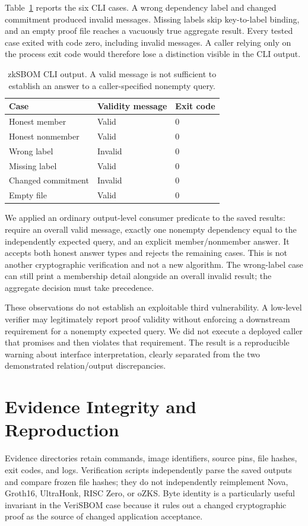 \documentclass[sigconf,nonacm]{acmart}
\begin{document}
Table~\ref{tab:zksbom} reports the six CLI cases. A wrong dependency label and changed commitment produced invalid messages. Missing labels skip key-to-label binding, and an empty proof file reaches a vacuously true aggregate result. Every tested case exited with code zero, including invalid messages. A caller relying only on the process exit code would therefore lose a distinction visible in the CLI output.

\begin{table}[t]
\caption{zkSBOM CLI output. A valid message is not sufficient to establish an answer to a caller-specified nonempty query.}
\label{tab:zksbom}
\centering\small
\begin{tabular}{@{}lll@{}}
\toprule Case & Validity message & Exit code \\
\midrule
Honest member & Valid & 0 \\
Honest nonmember & Valid & 0 \\
Wrong label & Invalid & 0 \\
Missing label & Valid & 0 \\
Changed commitment & Invalid & 0 \\
Empty file & Valid & 0 \\
\bottomrule
\end{tabular}
\end{table}

We applied an ordinary output-level consumer predicate to the saved results: require an overall valid message, exactly one nonempty dependency equal to the independently expected query, and an explicit member/nonmember answer. It accepts both honest answer types and rejects the remaining cases. This is not another cryptographic verification and not a new algorithm. The wrong-label case can still print a membership detail alongside an overall invalid result; the aggregate decision must take precedence.

These observations do not establish an exploitable third vulnerability. A low-level verifier may legitimately report proof validity without enforcing a downstream requirement for a nonempty expected query. We did not execute a deployed caller that promises and then violates that requirement. The result is a reproducible warning about interface interpretation, clearly separated from the two demonstrated relation/output discrepancies.

\section{Evidence Integrity and Reproduction}
Evidence directories retain commands, image identifiers, source pins, file hashes, exit codes, and logs. Verification scripts independently parse the saved outputs and compare frozen file hashes; they do not independently reimplement Nova, Groth16, UltraHonk, RISC Zero, or oZKS. Byte identity is a particularly useful invariant in the VeriSBOM case because it rules out a changed cryptographic proof as the source of changed application acceptance.
\end{document}
